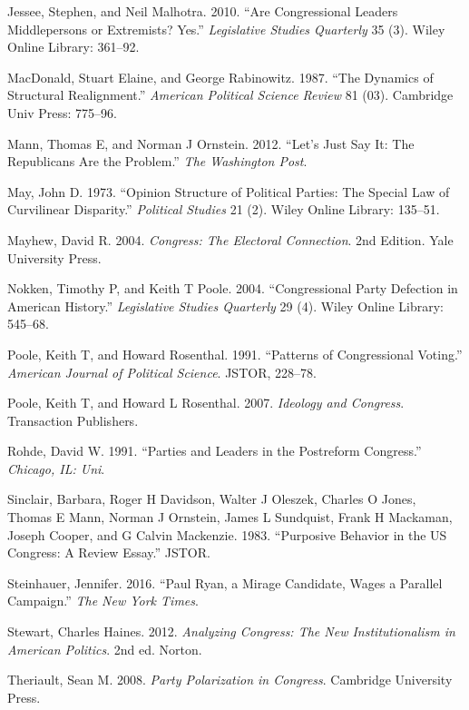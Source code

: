 \documentclass[12pt,twoside]{reedthesis}
\begin{document}
  Jessee, Stephen, and Neil Malhotra. 2010. ``Are Congressional Leaders
  Middlepersons or Extremists? Yes.'' \emph{Legislative Studies Quarterly}
  35 (3). Wiley Online Library: 361--92.
  
  MacDonald, Stuart Elaine, and George Rabinowitz. 1987. ``The Dynamics of
  Structural Realignment.'' \emph{American Political Science Review} 81
  (03). Cambridge Univ Press: 775--96.
  
  Mann, Thomas E, and Norman J Ornstein. 2012. ``Let's Just Say It: The
  Republicans Are the Problem.'' \emph{The Washington Post}.
  
  May, John D. 1973. ``Opinion Structure of Political Parties: The Special
  Law of Curvilinear Disparity.'' \emph{Political Studies} 21 (2). Wiley
  Online Library: 135--51.
  
  Mayhew, David R. 2004. \emph{Congress: The Electoral Connection}. 2nd
  Edition. Yale University Press.
  
  Nokken, Timothy P, and Keith T Poole. 2004. ``Congressional Party
  Defection in American History.'' \emph{Legislative Studies Quarterly} 29
  (4). Wiley Online Library: 545--68.
  
  Poole, Keith T, and Howard Rosenthal. 1991. ``Patterns of Congressional
  Voting.'' \emph{American Journal of Political Science}. JSTOR, 228--78.
  
  Poole, Keith T, and Howard L Rosenthal. 2007. \emph{Ideology and
  Congress}. Transaction Publishers.
  
  Rohde, David W. 1991. ``Parties and Leaders in the Postreform
  Congress.'' \emph{Chicago, IL: Uni}.
  
  Sinclair, Barbara, Roger H Davidson, Walter J Oleszek, Charles O Jones,
  Thomas E Mann, Norman J Ornstein, James L Sundquist, Frank H Mackaman,
  Joseph Cooper, and G Calvin Mackenzie. 1983. ``Purposive Behavior in the
  US Congress: A Review Essay.'' JSTOR.
  
  Steinhauer, Jennifer. 2016. ``Paul Ryan, a Mirage Candidate, Wages a
  Parallel Campaign.'' \emph{The New York Times}.
  
  Stewart, Charles Haines. 2012. \emph{Analyzing Congress: The New
  Institutionalism in American Politics}. 2nd ed. Norton.
  
  Theriault, Sean M. 2008. \emph{Party Polarization in Congress}.
  Cambridge University Press.


\end{document}
